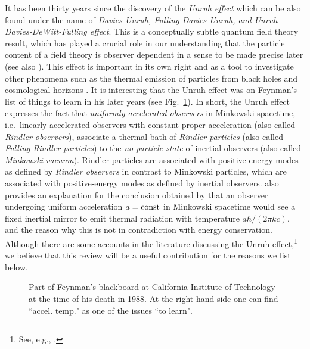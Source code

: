 \documentclass[12pt,nofootinbib,floatfix,aps,prd,showpacs,amsmath,amssymb,eqsecnum]{revtex4-2}
\begin{document}
It has been thirty years since the discovery of the {\em Unruh
effect} \cite{Unruh76} which can be also found under the name of 
{\em Davies-Unruh, Fulling-Davies-Unruh, {\rm and} 
Unruh-Davies-DeWitt-Fulling effect}. This is a conceptually subtle 
quantum field theory result, which has played a crucial role 
in our understanding that the particle content of a field 
theory is observer dependent in a sense to be made precise 
later \cite{Fulling73} (see also \textcite{Unruh77}). This effect
is important 
in its own right and as a tool to investigate other phenomena 
such as the thermal emission of particles from black holes 
\cite{Hawking74, Hawking75} and cosmological horizons 
\cite{Gibbonsetal77}. 
It is interesting that the Unruh effect was on Feynman's list of things
to learn in his later years (see Fig.~\ref{feyn1}).
In short, the Unruh effect expresses the fact that {\em uniformly 
accelerated observers} in Minkowski spacetime, i.e.~linearly 
accelerated observers with constant proper acceleration (also called 
{\em Rindler observers}), associate a thermal bath of {\em Rindler 
particles} (also called {\em Fulling-Rindler particles}) 
to the {\em no-particle state} of inertial observers
(also called {\em Minkowski vacuum}). 
Rindler particles are associated with positive-energy modes as 
defined by {\em Rindler observers} in contrast to Minkowski particles, 
which are associated with positive-energy modes as defined by inertial 
observers. \textcite{Unruh76} also provides an explanation for 
the conclusion obtained by \textcite{Davies75} 
that an observer undergoing uniform acceleration $a = {\rm const}$ 
in Minkowski spacetime would see a fixed inertial mirror to emit 
thermal radiation with temperature $a \hbar/(2 \pi k c )$, and the reason 
why this is not in contradiction with energy conservation. 
Although there are some accounts in the literature discussing the 
Unruh effect,\footnote{See, e.g.,
\textcite{Birrelletal82,Fullingetal87,Takagi86,
          Ginzburgetal87,WaldQFTCS,Sciamaetal81}.
                       }
we believe that this review will be a useful contribution 
for the reasons we list below. 
\begin{figure}[t]
\caption{\label{feyn1} Part of Feynman's blackboard at California
Institute of Technology 
at the time of his death in 1988. At the right-hand side 
one can find ``accel. temp." as one of the issues ``to learn".}
\end{figure}
\end{document}
